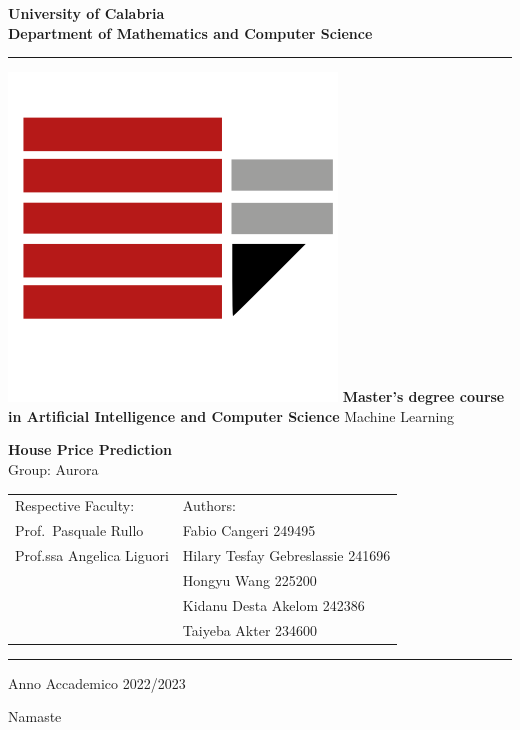 \documentclass[a4paper,12pt]{report}
\newenvironment{dedication}
  {\clearpage           %
   \thispagestyle{empty}%
   \vspace*{\stretch{1}}%
   \itshape             %
   \raggedleft          %
  }
   {\par %
   \vspace{\stretch{3}} %
   \clearpage           %
  }
\begin{document}
\begin{titlepage}
\begin{center}
\textbf{\LARGE University of Calabria}\\
\textbf{Department of Mathematics and Computer Science}\\
\vskip 6pt
\hrule
\vskip 8pt
\includegraphics[width=0.13\linewidth]{logo.png}
\vskip 8pt
\textbf{Master’s degree course in Artificial Intelligence and Computer Science}
\vskip 32pt
Machine Learning

\vskip 70pt
{ \huge \bfseries 
    House Price Prediction  
}\\[0.4cm]
\vskip 7pt
Group: Aurora
\vskip 120pt

\begin{tabular}{p{8cm}p{6cm}}
Respective Faculty: & Authors:\\
Prof.~Pasquale Rullo & Fabio Cangeri 249495 \\
Prof.ssa Angelica Liguori & Hilary Tesfay Gebreslassie 241696 \\
 & Hongyu Wang 225200 \\
 & Kidanu Desta Akelom 242386 \\
 & Taiyeba Akter 234600 \\
\end{tabular}


\vskip 60pt
\hrule
\vskip 6pt
Anno Accademico 2022/2023
\vfill
\end{center}

\end{titlepage}

\begin{dedication}
Namaste
\end{dedication}


\end{document}

